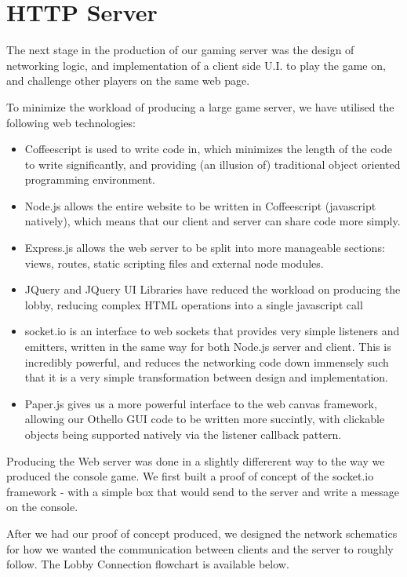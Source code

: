 \documentclass[a4wide, 11pt]{article}
\begin{document}
\section{HTTP Server}

The next stage in the production of our gaming server was the design of networking logic, and implementation of a client side U.I. to play the game on, and challenge other players on the same web page.

To minimize the workload of producing a large game server, we have utilised the following web technologies:
\begin{itemize}
\item Coffeescript is used to write code in, which minimizes the length of the code to write significantly, and providing (an illusion of) traditional object oriented programming environment.
\item Node.js allows the entire website to be written in Coffeescript (javascript natively), which means that our client and server can share code more simply.
\item Express.js allows the web server to be split into more manageable sections: views, routes, static scripting files and external node modules.
\item JQuery and JQuery UI Libraries have reduced the workload on producing the lobby, reducing complex HTML operations into  a single javascript call
\item socket.io is an interface to web sockets that provides very simple listeners and emitters, written in the same way for both Node.js server and client. This is incredibly powerful, and reduces the networking code down immensely such that it is a very simple transformation between design and implementation.
\item Paper.js gives us a more powerful interface to the web canvas framework, allowing our Othello GUI code to be written more succintly, with clickable objects being supported natively via the listener callback pattern.
\end{itemize}

Producing the Web server was done in a slightly differerent way to the way we produced the console game. We first built a proof of concept of the socket.io framework - with a simple box that would send to the server and write a message on the console. 

After we had our proof of concept produced, we designed the network schematics for how we wanted the communication between clients and the server to roughly follow. The Lobby Connection flowchart is available below.
\end{document}
